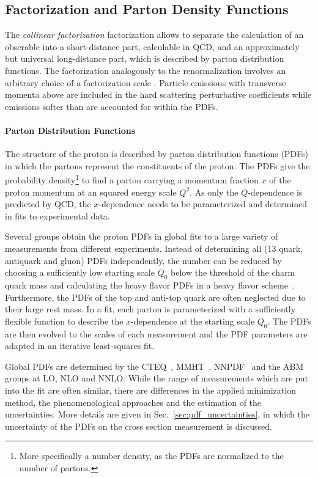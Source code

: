 \subsection{Factorization and Parton Density Functions}
\label{sec:factorization}

The \emph{collinear factorization} factorization allows to separate the
calculation of an obserable into a short-distance part, calculable in QCD, and
an approximately but universal long-distance part, which is described by parton
distribution functions. The factorization analogously to the renormalization
involves an arbitrary choice of a factorization scale \muf. Particle emissions
with transverse momenta above \muf are included in the hard scattering
perturbative coefficients while emissions softer than \muf are accounted for
within the PDFs.

\paragraph{Parton Distribution Functions}

The structure of the proton is described by parton distribution functions (PDFs)
in which the partons represent the constituents of the proton. The PDFs give
the probability density\footnote{More specifically a number density, as the PDFs are
normalized to the number of partons.} to find a parton carrying a momentum
fraction $x$ of the proton momentum at an squared energy scale $Q^2$. As only
the $Q$-dependence is predicted by QCD, the $x$-dependence needs to be
parameterized and determined in fits to experimental data.

Several groups obtain the proton PDFs in global fits to a large variety of
measurements from different experiments. Instead of determining all (13 quark,
antiquark and gluon) PDFs independently, the number can be reduced by choosing a
sufficiently low starting scale $Q_0$ below the threshold of the charm quark
mass and calculating the heavy flavor PDFs in a heavy flavor
scheme~\cite{Thorne:2006qt}. Furthermore, the PDFs of the top and anti-top quark
are often neglected due to their large rest mass. In a fit, each parton is
parameterized with a sufficiently flexible function to describe the
$x$-dependence at the starting scale $Q_0$. The PDFs are then evolved to the 
scales of each measurement and the PDF parameters are adapted in an iterative
least-squares fit.

Global PDFs are determined by the CTEQ~\cite{Dulat:2015mca},
MMHT~\cite{Harland-Lang:2014zoa}, NNPDF~\cite{Ball:2014uwa} and the
ABM~\cite{Alekhin:2013nda} groups at LO, NLO and NNLO. While the range of
measurements which are put into the fit are often similar, there are differences
in the applied minimization method, the phenomenological approaches and the
estimation of the uncertainties. More details are given in
Sec.~\ref{sec:pdf_uncertainties}, in which the uncertainty of the PDFs on the
cross section measurement is discussed.

